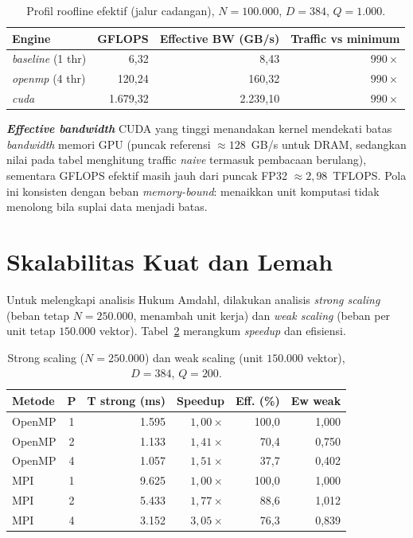 \documentclass[12pt,a4paper,oneside]{report}
\newcommand{\keyword}[1]{\textbf{\textit{#1}}}
\begin{document}
\begin{table}[H]
\centering
\caption{Profil roofline efektif (jalur cadangan), $N=100.000$, $D=384$, $Q=1.000$.}
\label{tab:profil}
\begin{tabular}{@{}l r r r@{}}
\toprule
\textbf{Engine} & \textbf{GFLOPS} & \textbf{Effective BW (GB/s)} & \textbf{Traffic vs minimum}\\
\midrule
\textit{baseline} (1 thr) & 6,32   & 8,43   & $990\times$\\
\textit{openmp} (4 thr)   & 120,24 & 160,32 & $990\times$\\
\textit{cuda}             & 1.679,32 & 2.239,10 & $990\times$\\
\bottomrule
\end{tabular}
\end{table}

\keyword{Effective bandwidth} CUDA yang tinggi menandakan kernel mendekati batas \textit{bandwidth} memori GPU (puncak referensi $\approx 128$~GB/s untuk DRAM, sedangkan nilai pada tabel menghitung traffic \textit{naive} termasuk pembacaan berulang), sementara GFLOPS efektif masih jauh dari puncak FP32 $\approx 2{,}98$~TFLOPS. Pola ini konsisten dengan beban \textit{memory-bound}: menaikkan unit komputasi tidak menolong bila suplai data menjadi batas.

\section{Skalabilitas Kuat dan Lemah}\label{sec:scaling}

Untuk melengkapi analisis Hukum Amdahl, dilakukan analisis \textit{strong scaling} (beban tetap $N=250.000$, menambah unit kerja) dan \textit{weak scaling} (beban per unit tetap $150.000$ vektor). Tabel~\ref{tab:scaling} merangkum \textit{speedup} dan efisiensi.

\begin{table}[H]
\centering
\caption{Strong scaling ($N=250.000$) dan weak scaling (unit $150.000$ vektor), $D=384$, $Q=200$.}
\label{tab:scaling}
{\small
\begin{tabular}{@{}l c r r r r@{}}
\toprule
\textbf{Metode} & \textbf{P} & \textbf{T strong (ms)} & \textbf{Speedup} & \textbf{Eff. (\%)} & \textbf{Ew weak}\\
\midrule
OpenMP & 1 & 1.595 & $1{,}00\times$ & 100,0 & 1,000\\
OpenMP & 2 & 1.133 & $1{,}41\times$ & 70,4  & 0,750\\
OpenMP & 4 & 1.057 & $1{,}51\times$ & 37,7  & 0,402\\
MPI    & 1 & 9.625 & $1{,}00\times$ & 100,0 & 1,000\\
MPI    & 2 & 5.433 & $1{,}77\times$ & 88,6  & 1,012\\
MPI    & 4 & 3.152 & $3{,}05\times$ & 76,3  & 0,839\\
\bottomrule
\end{tabular}
}
\end{table}
\end{document}

